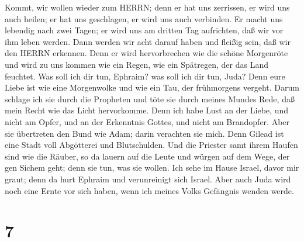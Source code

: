  Kommt, wir wollen wieder zum HERRN; denn er hat uns
zerrissen, er wird uns auch heilen; er hat uns geschlagen, er wird uns
auch verbinden.  Er macht uns lebendig nach zwei Tagen; er
wird uns am dritten Tag aufrichten, daß wir vor ihm leben werden.
 Dann werden wir acht darauf haben und fleißig sein, daß wir
den HERRN erkennen. Denn er wird hervorbrechen wie die schöne Morgenröte
und wird zu uns kommen wie ein Regen, wie ein Spätregen, der das Land
feuchtet.  Was soll ich dir tun, Ephraim? was soll ich dir
tun, Juda? Denn eure Liebe ist wie eine Morgenwolke und wie ein Tau, der
frühmorgens vergeht.  Darum schlage ich sie durch die
Propheten und töte sie durch meines Mundes Rede, daß mein Recht wie das
Licht hervorkomme.  Denn ich habe Lust an der Liebe, und
nicht am Opfer, und an der Erkenntnis Gottes, und nicht am Brandopfer.
 Aber sie übertreten den Bund wie Adam; darin verachten sie
mich.  Denn Gilead ist eine Stadt voll Abgötterei und
Blutschulden.  Und die Priester samt ihrem Haufen sind wie
die Räuber, so da lauern auf die Leute und würgen auf dem Wege, der gen
Sichem geht; denn sie tun, was sie wollen.  Ich sehe im
Hause Israel, davor mir graut; denn da hurt Ephraim und verunreinigt
sich Israel.  Aber auch Juda wird noch eine Ernte vor sich
haben, wenn ich meines Volks Gefängnis wenden werde.

\hypertarget{section-6}{%
\section{7}\label{section-6}}

